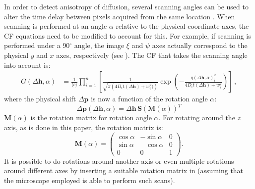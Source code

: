 In order to detect anisotropy of diffusion, several scanning angles can be used to alter the time delay
between pixels acquired from the same location 
\citep{Vendelin_08_AmJPhysiolCellPhysiol_295_pC1302}. 
When scanning is performed at an angle $\alpha$ relative to the physical
coordinate axes, the \ac{CF} equations need to be modified to account for this.
For example, if scanning is performed under a 90$^\circ$ angle, the
image $\xi$ and $\psi$ axes actually correspond to the physical $y$ and
$x$ axes, respectively (see \F{~\ref{fig:rics_theory3}}).
The \ac{CF} that takes the scanning angle into
account is:
\begin{align}
  G(\Delta \mathbf{h},\alpha) &= \frac{1}{\langle c \rangle} 
  \prod_{i=1}^n\left[
  \frac{1}{\sqrt{\pi\left(4D_it(\Delta \mathbf{h})+w_i^2)\right)}}
  \exp\left(-\frac{q(\Delta \mathbf{h},\alpha)_i^2}
  {4D_it(\Delta \mathbf{h})+w_i^2}\right)\right]\,,
  \label{eq:G_alpha}
\end{align}
where the physical shift $\Delta \mathbf{p}$ is now a function of the rotation
angle $\alpha$:
\begin{equation}
  \label{eq:phys_wangle}
  \Delta \mathbf{p}(\Delta \mathbf{h},\alpha) =
  \Delta \mathbf{h}\,\mathbf{S}\left(\mathbf{M}\left(\alpha\right)\right)^T
\end{equation}
$\mathbf{M}(\alpha)$ is the rotation matrix for rotation angle
$\alpha$. For rotating around the $z$ axis, as is done in this paper, the
rotation matrix is:
\begin{equation*}
  \mathbf{M}(\alpha) = 
  \begin{pmatrix}
    \cos\alpha & -\sin\alpha & 0\\
    \sin\alpha & \,\,\,\,\,\cos\alpha & 0\\
    0&0&1
 \end{pmatrix}.
\end{equation*}
It is possible to do rotations around  another  axis or even multiple
rotations around different axes by inserting a suitable rotation matrix
in \Eq{~\ref{eq:phys_wangle}}
(assuming that the microscope employed is able to perform such scans).

